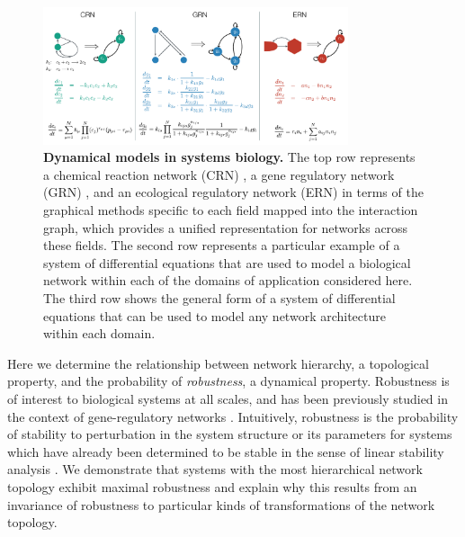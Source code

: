 \begin{figure}[!ht]
\centering
\noindent\includegraphics[width=0.8\textwidth]{fig/biomodelexamples.pdf}
\caption{{\bf Dynamical models in systems biology.} The top row represents a chemical reaction network (CRN) \cite{Shinar2010}, a gene regulatory network (GRN) \cite{Karlebach2008}, and an ecological regulatory network (ERN) \cite{Rohr2014} in terms of the graphical methods specific to each field mapped into the interaction graph, which provides a unified representation for networks across these fields. The second row represents a particular example of a system of differential equations that are used to model a biological network within each of the domains of application considered here. The third row shows the general form of a system of differential equations that can be used to model any network architecture within each domain.}
\label{fig:biomodelexamples}
\end{figure}

Here we determine the relationship between network hierarchy, a topological property, and the probability of \emph{robustness}, a dynamical property. Robustness is of interest to biological systems at all scales, and has been previously studied in the context of gene-regulatory networks \cite{WADDINGTON1942a,VanNimwegen1999,Siegal2002,Ciliberti2007b,Ciliberti2007,Wagner2013}. Intuitively, robustness is the probability of stability to perturbation in the system structure or its parameters for systems which have already been determined to be stable in the sense of linear stability analysis \cite{Davis1962}. We demonstrate that systems with the most hierarchical network topology exhibit maximal robustness and explain why this results from an invariance of robustness to particular kinds of transformations of the network topology.
